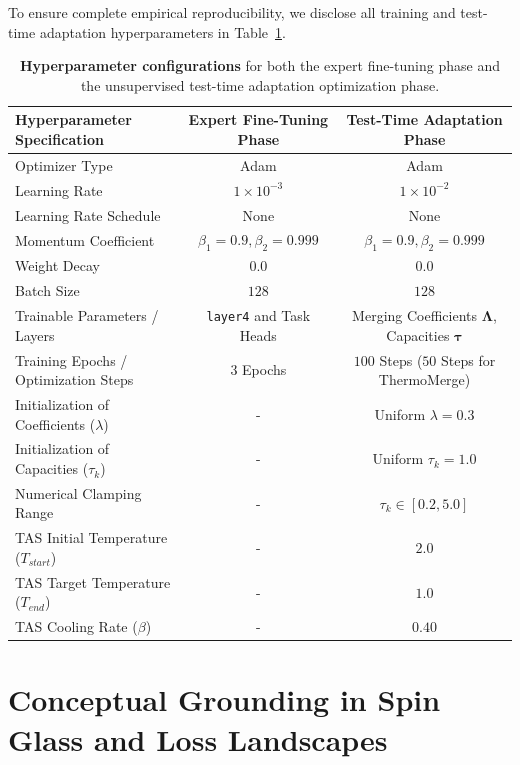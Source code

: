 \documentclass{article}
\theoremstyle{plain}
\theoremstyle{definition}
\theoremstyle{remark}
\begin{document}
To ensure complete empirical reproducibility, we disclose all training and test-time adaptation hyperparameters in Table~\ref{tab:app_hyperparameters}.

\begin{table}[h]
\centering
\caption{\textbf{Hyperparameter configurations} for both the expert fine-tuning phase and the unsupervised test-time adaptation optimization phase.}
\label{tab:app_hyperparameters}
\vskip 0.15in
\begin{small}
\begin{sc}
\begin{tabular}{lcc}
\toprule
Hyperparameter Specification & Expert Fine-Tuning Phase & Test-Time Adaptation Phase \\
\midrule
Optimizer Type & Adam & Adam \\
Learning Rate & $1 \times 10^{-3}$ & $1 \times 10^{-2}$ \\
Learning Rate Schedule & None & None \\
Momentum Coefficient & $\beta_1=0.9, \beta_2=0.999$ & $\beta_1=0.9, \beta_2=0.999$ \\
Weight Decay & $0.0$ & $0.0$ \\
Batch Size & $128$ & $128$ \\
Trainable Parameters / Layers & \texttt{layer4} and Task Heads & Merging Coefficients $\boldsymbol{\Lambda}$, Capacities $\boldsymbol{\tau}$ \\
Training Epochs / Optimization Steps & $3$ Epochs & $100$ Steps ($50$ Steps for ThermoMerge) \\
Initialization of Coefficients ($\lambda$) & - & Uniform $\lambda=0.3$ \\
Initialization of Capacities ($\tau_k$) & - & Uniform $\tau_k=1.0$ \\
Numerical Clamping Range & - & $\tau_k \in [0.2, 5.0]$ \\
TAS Initial Temperature ($T_{start}$) & - & $2.0$ \\
TAS Target Temperature ($T_{end}$) & - & $1.0$ \\
TAS Cooling Rate ($\beta$) & - & $0.40$ \\
\bottomrule
\end{tabular}
\end{sc}
\end{small}
\end{table}

\section{Conceptual Grounding in Spin Glass and Loss Landscapes}
\label{sec:spin_glass_details}
\end{document}
